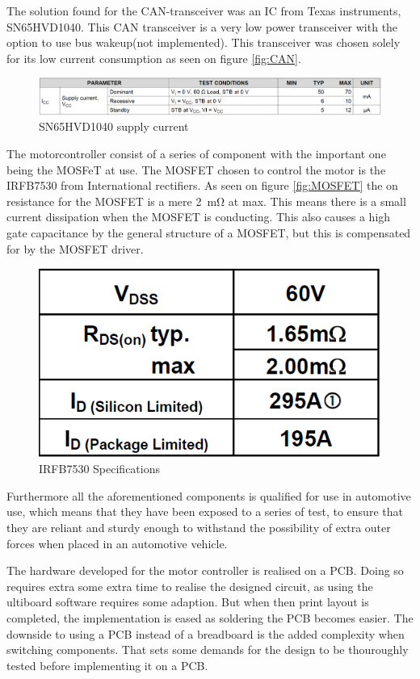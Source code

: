The solution found for the CAN-transceiver was an IC from Texas instruments, SN65HVD1040\cite{CAN}. This CAN transceiver is a very low power transceiver with the option to use bus wakeup(not implemented). This transceiver was chosen solely for its low current consumption as seen on figure \vref{fig:CAN}. 

\begin{figure}[H]
	\centering
	\includegraphics[width=1\linewidth]{Hardware/Pictures/CAN}
	\caption{SN65HVD1040 supply current}
	\label{fig:CAN}
\end{figure}

The motorcontroller consist of a series of component with the important one being the MOSFeT at use. The MOSFET chosen to control the motor is the IRFB7530\cite{IRFB7530} from International rectifiers. As seen on figure \vref{fig:MOSFET} the on resistance for the MOSFET is a mere \SI{2}{\milli \ohm} at max. This means there is a small current dissipation when the MOSFET is conducting. This also causes a high gate capacitance by the general structure of a MOSFET, but this is compensated for by the MOSFET driver.  

\begin{figure}[H]
	\centering
	\includegraphics[width=0.5\linewidth]{Hardware/Pictures/IRFB7530}
	\caption{IRFB7530 Specifications}
	\label{fig:MOSFET}
\end{figure}

Furthermore all the aforementioned components is qualified for use in automotive use, which means that they have been exposed to a series of test, to ensure that they are reliant and sturdy enough to withstand the possibility of extra outer forces when placed in an automotive vehicle. 

The hardware developed for the motor controller is realised on a PCB. Doing so requires extra some extra time to realise the designed circuit, as using the ultiboard software requires some adaption. But when then print layout is completed, the implementation is eased as soldering the PCB becomes easier. The downside to using a PCB instead of a breadboard is the added complexity when switching components. That sets some demands for the design to be thouroughly tested before implementing it on a PCB.

